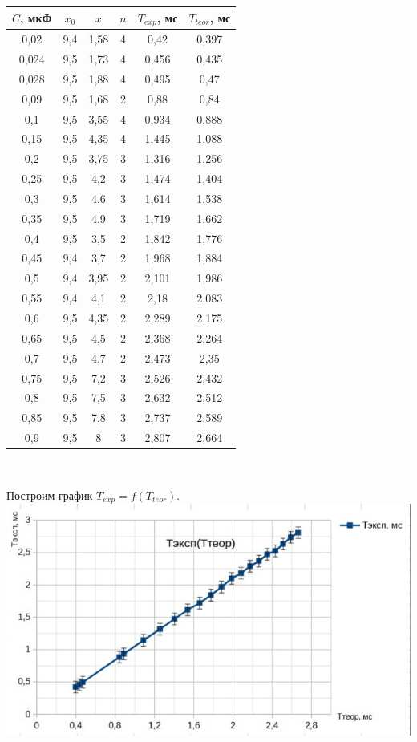 \documentclass[11pt]{article}
\begin{document}
\begin{center}
\begin{tabular}{|c|c|c|c|c|c|}\\
\hline
$C$, мкФ & $x_0$ & $x$ & $n$ & $T_{exp}$, мс & $T_{teor}$, мс\\
\hline
0,02 & 9,4 & 1,58 & 4 & 0,42 & 0,397\\
\hline
0,024 & 9,5 & 1,73 & 4 & 0,456 & 0,435\\
\hline
0,028 & 9,5 & 1,88 & 4 & 0,495 & 0,47\\
\hline
0,09 & 9,5 & 1,68 & 2 & 0,88 & 0,84\\
\hline
0,1 & 9,5 & 3,55 & 4 & 0,934 & 0,888\\
\hline
0,15 & 9,5 & 4,35 & 4 & 1,445 & 1,088\\
\hline
0,2 & 9,5 & 3,75 & 3 & 1,316 & 1,256\\
\hline
0,25 & 9,5 & 4,2 & 3 & 1,474 & 1,404\\
\hline
0,3 & 9,5 & 4,6 & 3 & 1,614 & 1,538\\
\hline
0,35 & 9,5 & 4,9 & 3& 1,719 & 1,662\\
\hline
0,4 & 9,5 & 3,5 & 2 & 1,842 & 1,776\\
\hline
0,45 & 9,4 & 3,7 & 2 & 1,968 & 1,884\\
\hline
0,5 & 9,4 & 3,95 & 2 & 2,101 & 1,986\\
\hline
0,55 & 9,4 & 4,1 & 2 & 2,18 & 2,083\\
\hline
0,6 & 9,5 & 4,35 & 2 & 2,289 & 2,175\\
\hline
0,65 & 9,5 & 4,5 & 2 & 2,368 & 2,264\\
\hline
0,7 & 9,5 & 4,7 & 2 & 2,473 & 2,35\\
\hline
0,75 & 9,5 & 7,2 & 3 & 2,526 & 2,432\\
\hline
0,8 & 9,5 & 7,5 & 3 & 2,632 & 2,512\\
\hline
0,85 & 9,5 & 7,8 & 3 & 2,737 & 2,589\\
\hline
0,9 & 9,5 & 8 & 3 & 2,807 & 2,664\\
\hline
\end{tabular}\\
\end{center}
Построим график $T_{exp} = f(T_{teor})$.\\
\includegraphics[width=18cm]{g4}\\
\end{document}
